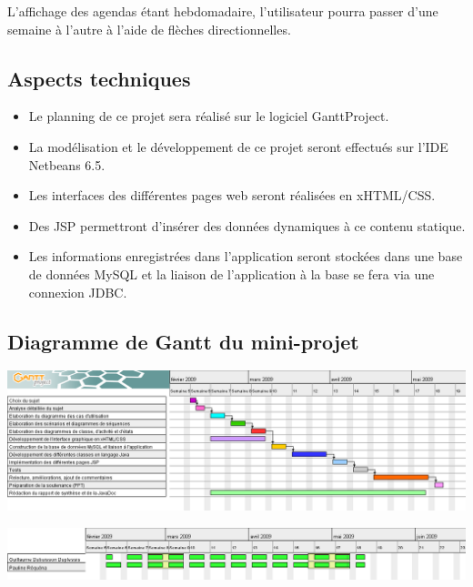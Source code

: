 \documentclass[12pt , a4paper]{article}
\begin{document}
L{\textquoteright}affichage des agendas \'etant hebdomadaire,
l{\textquoteright}utilisateur pourra passer d{\textquoteright}une
semaine \`a l{\textquoteright}autre \`a l{\textquoteright}aide de
fl\`eches directionnelles.

\subsection{Aspects techniques}

\begin{itemize}
\item Le planning de ce projet sera r\'ealis\'e sur le logiciel
  GanttProject.
\item La mod\'elisation et le d\'eveloppement de ce projet seront
  effectu\'es sur l{\textquoteright}IDE Netbeans 6.5.
\item Les interfaces des diff\'erentes pages web seront r\'ealis\'ees en
  xHTML/CSS.
\item Des JSP permettront d{\textquoteright}ins\'erer des donn\'ees
  dynamiques \`a ce contenu statique.
\item Les informations enregistr\'ees dans l{\textquoteright}application
  seront stock\'ees dans une base de donn\'ees MySQL et la liaison de
  l{\textquoteright}application \`a la base se fera via une connexion
  JDBC.
\end{itemize}
\begin{landscape}
\subsection{Diagramme de Gantt du mini-projet}
	\begin{center}
	  \includegraphics[scale=0.6]{./images/planning_projet_JAVA.png}
	\end{center}
	\begin{center}
	  \includegraphics[scale=0.6]{./images/planning_projet_JAVA_res.png}
	\end{center}
\end{landscape}
\end{document}
